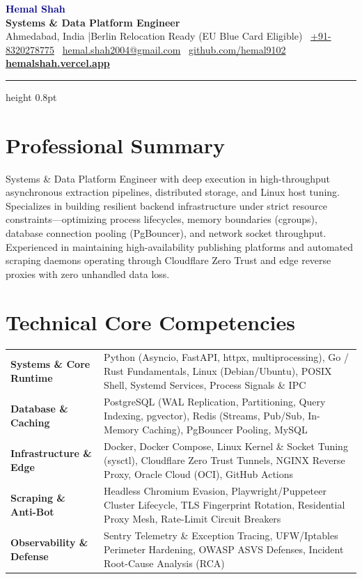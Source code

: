 \documentclass[10pt]{article}
\newcommand{\faPhone}{{\small\textbullet}}
\newcommand{\faEnvelope}{{\small\textbullet}}
\newcommand{\faGithub}{{\small\textbullet}}
\begin{document}
\begin{center}
{\Huge \textbf{\textcolor{darkblue}{Hemal Shah}}} \\[3pt]
{\large \textbf{\textcolor{accentblue}{Systems \& Data Platform Engineer}}} \\[2.5pt]
{\small\color{medgray}
Ahmedabad, India \quad|\quad Berlin Relocation Ready (EU Blue Card Eligible) \quad
\faPhone\ \href{tel:+918320278775}{+91-8320278775} \quad
\faEnvelope\ \href{mailto:hemal.shah2004@gmail.com}{hemal.shah2004@gmail.com} \quad
\faGithub\ \href{https://github.com/hemal9102}{github.com/hemal9102} \quad
\href{https://hemalshah.vercel.app}{\textbf{hemalshah.vercel.app}}
}
\end{center}

\vspace{-4pt}
{\color{borderblue}\hrule height 0.8pt}
\vspace{2.5pt}

\section*{Professional Summary}
{\small
Systems \& Data Platform Engineer with deep execution in high-throughput asynchronous extraction pipelines, distributed storage, and Linux host tuning. Specializes in building resilient backend infrastructure under strict resource constraints---optimizing process lifecycles, memory boundaries (cgroups), database connection pooling (PgBouncer), and network socket throughput. Experienced in maintaining high-availability publishing platforms and automated scraping daemons operating through Cloudflare Zero Trust and edge reverse proxies with zero unhandled data loss.
}

\section*{Technical Core Competencies}
{\small
\begin{tabularx}{\textwidth}{@{}>{\bfseries\color{darkblue}}l@{\quad}X@{}}
Systems \& Core Runtime & Python (Asyncio, FastAPI, httpx, multiprocessing), Go / Rust Fundamentals, Linux (Debian/Ubuntu), POSIX Shell, Systemd Services, Process Signals \& IPC \\
Database \& Caching & PostgreSQL (WAL Replication, Partitioning, Query Indexing, pgvector), Redis (Streams, Pub/Sub, In-Memory Caching), PgBouncer Pooling, MySQL \\
Infrastructure \& Edge & Docker, Docker Compose, Linux Kernel \& Socket Tuning (sysctl), Cloudflare Zero Trust Tunnels, NGINX Reverse Proxy, Oracle Cloud (OCI), GitHub Actions \\
Scraping \& Anti-Bot & Headless Chromium Evasion, Playwright/Puppeteer Cluster Lifecycle, TLS Fingerprint Rotation, Residential Proxy Mesh, Rate-Limit Circuit Breakers \\
Observability \& Defense & Sentry Telemetry \& Exception Tracing, UFW/Iptables Perimeter Hardening, OWASP ASVS Defenses, Incident Root-Cause Analysis (RCA) \\
\end{tabularx}
}
\end{document}
